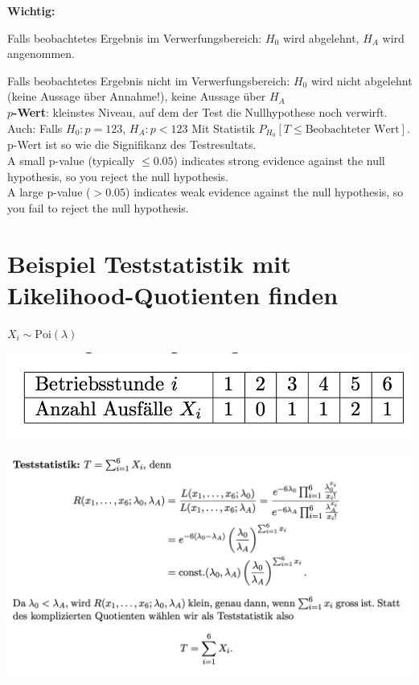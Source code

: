 \textbf{Wichtig:}

Falls beobachtetes Ergebnis im Verwerfungsbereich: $H_0$ wird abgelehnt, $H_A$ wird angenommen.

Falls beobachtetes Ergebnis nicht im Verwerfungsbereich: $H_0$ wird nicht abgelehnt (keine Aussage über Annahme!), keine Aussage über $H_A$\\


\textbf{$p$-Wert}: kleinstes Niveau, auf dem der Test die Nullhypothese noch verwirft.\\

Auch: Falls $H_0: p = 123$, $H_A: p < 123$ Mit Statistik $P_{H_0}[T\leq \text{Beobachteter Wert}]$. p-Wert ist so wie die Signifikanz des Testresultats.\\

A small p-value (typically $\leq 0.05$) indicates strong evidence against the null hypothesis, so you reject the null hypothesis.\\

A large p-value ($> 0.05$) indicates weak evidence against the null hypothesis, so you fail to reject the null hypothesis.

\section{Beispiel Teststatistik mit Likelihood-Quotienten finden}

$X_i \sim \text{Poi}(\lambda)$ 

\includegraphics[width=.4\textwidth]{images/likelihood1}

\includegraphics[width=\textwidth]{images/likelihood2}

